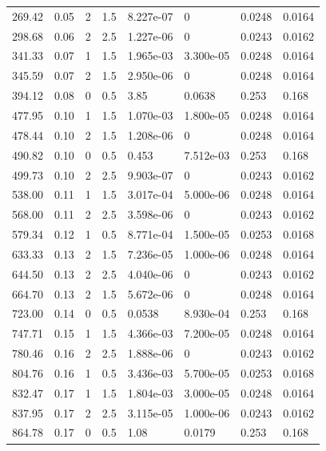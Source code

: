 \documentclass[preview]{standalone}
\begin{document}
{{\begin{tabular}{L{1.2cm}C{1.2cm} C{0.3cm}C{0.5cm} C{1.4cm}C{1.4cm} C{1.4cm}C{1.4cm}}
  269.42  &  0.05  & 2     & 1.5 &  8.227e-07  & 0  & 0.0248 &  0.0164   \\ 
  298.68  &  0.06  & 2     & 2.5 &  1.227e-06  & 0  & 0.0243 &  0.0162   \\ 
  341.33  &  0.07  & 1     & 1.5 &  1.965e-03  & 3.300e-05  & 0.0248 &  0.0164   \\ 
  345.59  &  0.07  & 2     & 1.5 &  2.950e-06  & 0  & 0.0248 &  0.0164   \\ 
  394.12  &  0.08  & 0     & 0.5 &  3.85  & 0.0638  & 0.253 &  0.168   \\ 
  477.95  &  0.10  & 1     & 1.5 &  1.070e-03  & 1.800e-05  & 0.0248 &  0.0164   \\ 
  478.44  &  0.10  & 2     & 1.5 &  1.208e-06  & 0  & 0.0248 &  0.0164   \\ 
  490.82  &  0.10  & 0     & 0.5 &  0.453  & 7.512e-03  & 0.253 &  0.168   \\ 
  499.73  &  0.10  & 2     & 2.5 &  9.903e-07  & 0  & 0.0243 &  0.0162   \\ 
  538.00  &  0.11  & 1     & 1.5 &  3.017e-04  & 5.000e-06  & 0.0248 &  0.0164   \\ 
  568.00  &  0.11  & 2     & 2.5 &  3.598e-06  & 0  & 0.0243 &  0.0162   \\ 
  579.34  &  0.12  & 1     & 0.5 &  8.771e-04  & 1.500e-05  & 0.0253 &  0.0168   \\ 
  633.33  &  0.13  & 2     & 1.5 &  7.236e-05  & 1.000e-06  & 0.0248 &  0.0164   \\ 
  644.50  &  0.13  & 2     & 2.5 &  4.040e-06  & 0  & 0.0243 &  0.0162   \\ 
  664.70  &  0.13  & 2     & 1.5 &  5.672e-06  & 0  & 0.0248 &  0.0164   \\ 
  723.00  &  0.14  & 0     & 0.5 &  0.0538  & 8.930e-04  & 0.253 &  0.168   \\ 
  747.71  &  0.15  & 1     & 1.5 &  4.366e-03  & 7.200e-05  & 0.0248 &  0.0164   \\ 
  780.46  &  0.16  & 2     & 2.5 &  1.888e-06  & 0  & 0.0243 &  0.0162   \\ 
  804.76  &  0.16  & 1     & 0.5 &  3.436e-03  & 5.700e-05  & 0.0253 &  0.0168   \\ 
  832.47  &  0.17  & 1     & 1.5 &  1.804e-03  & 3.000e-05  & 0.0248 &  0.0164   \\ 
  837.95  &  0.17  & 2     & 2.5 &  3.115e-05  & 1.000e-06  & 0.0243 &  0.0162   \\ 
  864.78  &  0.17  & 0     & 0.5 &  1.08  & 0.0179  & 0.253 &  0.168   \\ 

\end{tabular}}}
\end{document}
